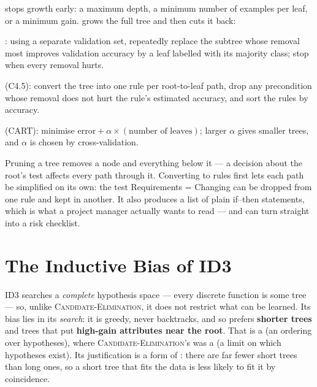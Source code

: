 \begin{definitionbox}[Pruning]
 stops growth early: a maximum depth, a minimum number of
examples per leaf, or a minimum gain.  grows the full tree and
then cuts it back:
\begin{tight}
  \item {}: using a separate validation set, repeatedly
        replace the subtree whose removal most improves validation accuracy by a
        leaf labelled with its majority class; stop when every removal hurts.
  \item {} (C4.5): convert the tree into one rule per
        root-to-leaf path, drop any precondition whose removal does not hurt the
        rule's estimated accuracy, and sort the rules by accuracy.
  \item {} (CART): minimise
        $\text{error} + \alpha \times (\text{number of leaves})$; larger $\alpha$ gives
        smaller trees, and $\alpha$ is chosen by cross-validation.
\end{tight}
\end{definitionbox}

\begin{conceptbox}
Pruning a tree removes a node and everything below it --- a decision about the
root's test affects every path through it. Converting to rules first lets each
path be simplified on its own: the test Requirements = Changing can be dropped
from one rule and kept in another. It also produces a list of plain if--then
statements, which is what a project manager actually wants to read --- and can
turn straight into a risk checklist.
\end{conceptbox}

\section{The Inductive Bias of ID3}

ID3 searches a \emph{complete} hypothesis space --- every discrete function is
some tree --- so, unlike \textsc{Candidate-Elimination}, it does not restrict
what can be learned. Its bias lies in its \emph{search}: it is greedy, never
backtracks, and so prefers \textbf{shorter trees} and trees that put
\textbf{high-gain attributes near the root}. That is a 
(an ordering over hypotheses), where \textsc{Candidate-Elimination}'s was a
 (a limit on which hypotheses exist). Its justification is
a form of : there are far fewer short trees than long ones,
so a short tree that fits the data is less likely to fit it by coincidence.

